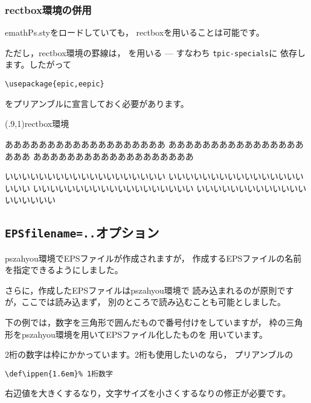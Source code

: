 \documentclass[a4j]{jarticle}
\begin{document}
\subsubsection{\textsf{rectbox}環境の併用}
\textsf{emathPs.sty}をロードしていても，
\textsf{rectbox}を用いることは可能です。

ただし，\textsf{rectbox}環境の罫線は，
を用いる --- すなわち \texttt{tpic-specials}に
依存します。したがって
\begin{jquote}
\begin{verbatim}
\usepackage{epic,eepic}
\end{verbatim}
\end{jquote}
をプリアンブルに宣言しておく必要があります。

\begin{showEx}(.9,1){\textsf{rectbox}環境}
\begin{rectbox}
あああああああああああああああああああ
あああああああああああああああああああ
あああああああああああああああああああ

いいいいいいいいいいいいいいいいいいい
いいいいいいいいいいいいいいいいいいい
いいいいいいいいいいいいいいいいいいい
いいいいいいいいいいいいいいいいいいい
\end{rectbox}
\end{showEx}

\subsection{\texttt{EPSfilename=..}オプション}
\textsf{pszahyou}環境でEPSファイルが作成されますが，
作成するEPSファイルの名前を指定できるようにしました。

さらに，作成したEPSファイルは\textsf{pszahyou}環境で
読み込まれるのが原則ですが，ここでは読み込まず，
別のところで読み込むことも可能としました。

下の例では，数字を三角形で囲んだもので番号付けをしていますが，
枠の三角形を\textsf{pszahyou}環境を用いてEPSファイル化したものを
用いています。

2桁の数字は枠にかかっています。2桁も使用したいのなら，
プリアンブルの
\begin{jquote}
\begin{verbatim}
\def\ippen{1.6em}% 1桁数字
\end{verbatim}
\end{jquote}
右辺値を大きくするなり，文字サイズを小さくするなりの修正が必要です。
\end{document}
